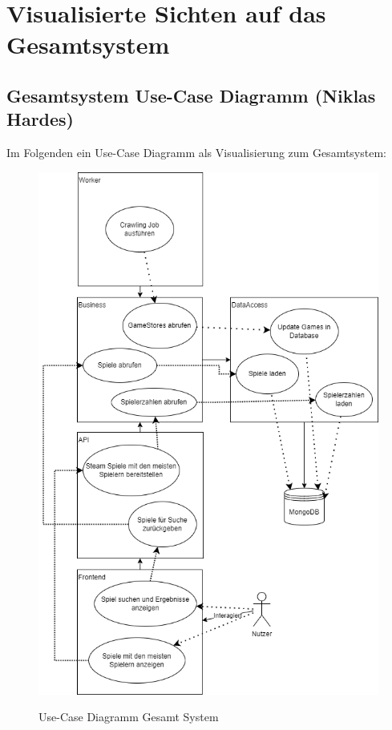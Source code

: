 
\section{Visualisierte Sichten auf das Gesamtsystem}

\subsection*{Gesamtsystem Use-Case Diagramm (Niklas Hardes)}

Im Folgenden ein Use-Case Diagramm als Visualisierung zum Gesamtsystem:

\begin{figure}[hbt!]
    \begin{minipage}[t]{.7\textwidth} %
        \caption{Use-Case Diagramm Gesamt System} %
        \includegraphics[width=1\textwidth]{img/use_case_gesamt_system.png}\\ %
    \end{minipage}
\end{figure}
